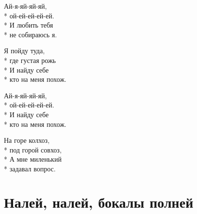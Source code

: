 \medskip

\begin{minipage}{\linewidth}
\hspace*{1.5em}Ай-я-яй-яй-яй,\\*
\hspace*{1.5em}ой-ей-ей-ей-ей.\\*
\hspace*{1.5em}И любить тебя\\*
\hspace*{1.5em}не собираюсь я.\\
\end{minipage}\par\medskip\nobreak

\medskip

\begin{minipage}{\linewidth}
Я пойду туда,\\*
где густая рожь\\*
И найду себе\\*
кто на меня похож.\\
\end{minipage}\par\medskip\nobreak

\medskip

\begin{minipage}{\linewidth}
\hspace*{1.5em}Ай-я-яй-яй-яй,\\*
\hspace*{1.5em}ой-ей-ей-ей-ей.\\*
\hspace*{1.5em}И найду себе\\*
\hspace*{1.5em}кто на меня похож.\\
\end{minipage}\par\medskip\nobreak

\medskip

\begin{minipage}{\linewidth}
На горе колхоз,\\*
под горой совхоз,\\*
А мне миленький\\*
задавал вопрос.\\
\end{minipage}

\vspace{\fill}\newpage

\section{Налей, налей, бокалы полней}
\label{song:Налей,_налей,_бокалы_полней}

